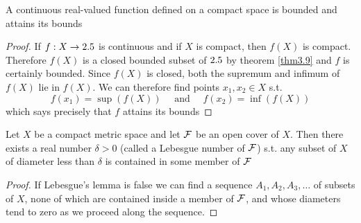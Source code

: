 \documentclass[11pt]{article}
\begin{document}
\begin{theorem}[]
A continuous real-valued function defined on a compact space is bounded and
attains its bounds
\end{theorem}

\begin{proof}
If \(f:X\to2.5\) is continuous and if \(X\) is compact, then \(f(X)\) is
compact. Therefore \(f(X)\) is a closed bounded subset of \(2.5\) by theorem
\ref{thm3.9} and \(f\) is certainly bounded. Since \(f(X)\) is closed, both the
supremum and infimum of \(f(X)\) lie in \(f(X)\). We can therefore find
points \(x_1,x_2\in X\) s.t.
\begin{equation*}
f(x_1)=\sup(f(X))\quad\text{ and }\quad
f(x_2)=\inf(f(X))
\end{equation*}
which says precisely that \(f\) attains its bounds
\end{proof}

\begin{lemma}
Let \(X\) be a compact metric space and let \(\mathcal{F}\) be an open cover of
\(X\). Then there exists a real number \(\delta>0\) (called a Lebesgue number of
\(\mathcal{F}\)) s.t. any subset of \(X\) of diameter less than \(\delta\) is contained in
some member of \(\mathcal{F}\)
\end{lemma}

\begin{proof}
If Lebesgue's lemma is false we can find a sequence \(A_1,A_2,A_3,\dots\) of
subsets of \(X\), none of which are contained inside a member of \(\mathcal{F}\),
and whose diameters tend to zero as we proceed along the sequence.
\end{proof}
\end{document}
